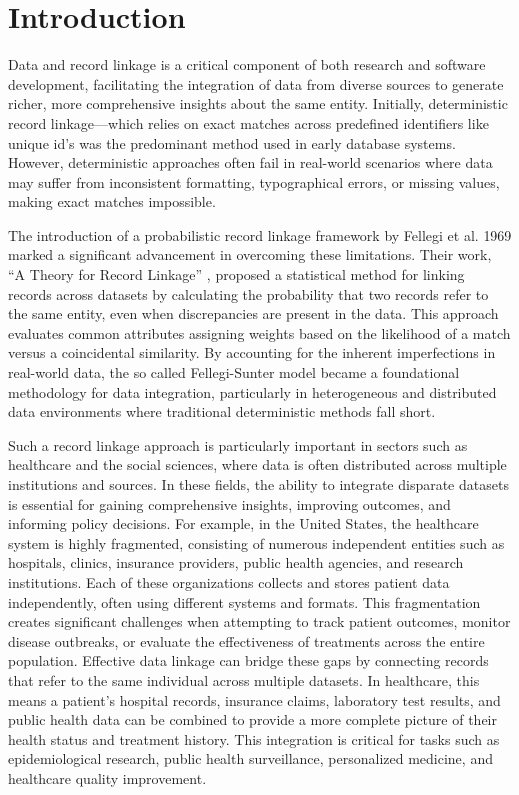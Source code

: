 \chapter{Introduction}  \label{sec:introduction}

Data and record linkage is a critical component of both research and software development, facilitating the integration of data from diverse sources to generate richer, more comprehensive insights about the same entity. 
Initially, deterministic record linkage—which relies on exact matches across predefined identifiers like unique id's was the predominant method used in early database systems. 
However, deterministic approaches often fail in real-world scenarios where data may suffer from inconsistent formatting, typographical errors, or missing values, making exact matches impossible.

The introduction of a probabilistic record linkage framework by Fellegi et al. \cite{fellegi1969theory} 1969 marked a significant advancement in overcoming these limitations. 
Their work, \enquote{A Theory for Record Linkage} \cite{fellegi1969theory}, proposed a statistical method for linking records across datasets by calculating the probability that two records refer to the same entity, even when discrepancies are present in the data. 
This approach evaluates common attributes assigning weights based on the likelihood of a match versus a coincidental similarity. 
By accounting for the inherent imperfections in real-world data, the so called Fellegi-Sunter model became a foundational methodology for data integration, particularly in heterogeneous and distributed data environments where traditional deterministic methods fall short.

Such a record linkage approach is particularly important in sectors such as healthcare and the social sciences, where data is often distributed across multiple institutions and sources. 
In these fields, the ability to integrate disparate datasets is essential for gaining comprehensive insights, improving outcomes, and informing policy decisions.
For example, in the United States, the healthcare system is highly fragmented, consisting of numerous independent entities such as hospitals, clinics, insurance providers, public health agencies, and research institutions. 
Each of these organizations collects and stores patient data independently, often using different systems and formats. 
This fragmentation creates significant challenges when attempting to track patient outcomes, monitor disease outbreaks, or evaluate the effectiveness of treatments across the entire population.
Effective data linkage can bridge these gaps by connecting records that refer to the same individual across multiple datasets. In healthcare, this means a patient's hospital records, insurance claims, laboratory test results, and public health data can be combined to provide a more complete picture of their health status and treatment history. 
This integration is critical for tasks such as epidemiological research, public health surveillance, personalized medicine, and healthcare quality improvement.

